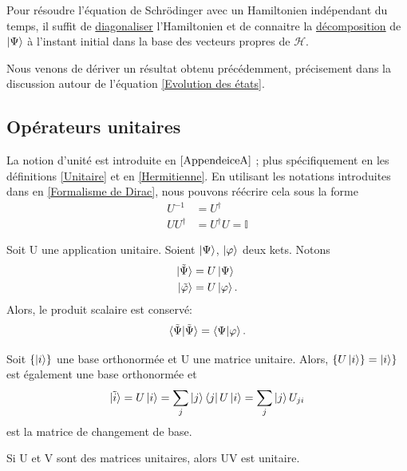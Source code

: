 \documentclass[../notesdecours.tex]{subfiles}
\begin{document}
Pour résoudre l'équation de Schrödinger avec un Hamiltonien indépendant du temps, il suffit de \underline{diagonaliser} l'Hamiltonien et de connaitre la \underline{décomposition} de $\ket{\Psi}$ à l'instant initial dans la base des vecteurs propres de $\mathcal{H}$.\\

\begin{remark}
	Nous venons de dériver un résultat obtenu précédemment, précisement dans la discussion autour de l'équation \eqref{Evolution des états}.
\end{remark}

\subsection{Opérateurs unitaires}
La notion d'unité est introduite en $\ref{AppendeiceA}$ ; plus spécifiquement en les définitions \ref{Unitaire} et en \ref{Hermitienne}. En utilisant les notations introduites dans en \ref{Formalisme de Dirac}, nous pouvons réécrire cela sous la forme
\begin{align}
U^{-1} &= U^\dag\\
UU^\dag &= U^\dag U = \mathbb{I}
\end{align}
\begin{Property} Soit U une application unitaire. Soient $\ket{\Psi}$, $\ket{\varphi}$ deux kets. Notons
\begin{align*}
\ket{\tilde{\Psi}} &= U\ket{\Psi}\\
\ket{\tilde{\varphi}} &= U\ket{\varphi}.
\end{align*}
Alors, le produit scalaire est conservé:
\begin{equation}
\braket{\tilde{\Psi}|\tilde{\Psi}} = \braket{\Psi|\varphi}.
\end{equation}
\end{Property}

\begin{Property} 
Soit $\{\ket{i}\}$ une base orthonormée et U une matrice unitaire. Alors, $\{U\ket{i}\} = \ket{i}\}$ est également une base orthonormée et 
\begin{equation}
\ket{\tilde{i}} = U\ket{i} = \sum_j \ket{j}\bra{j}U\ket{i} = \sum_j \ket{j}U_{ji}
\end{equation}
est la matrice de changement de base.
\end{Property}

\begin{Property}
Si U et V sont des matrices unitaires, alors UV est unitaire. \end{Property}
\end{document}
